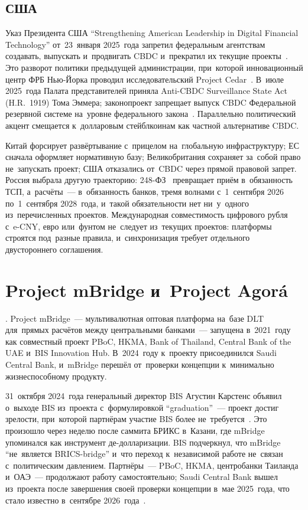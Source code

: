 \subsection*{США}

Указ Президента США \enquote{Strengthening American Leadership in Digital
Financial Technology} от~23~января 2025~года запретил федеральным агентствам
создавать, выпускать и~продвигать CBDC и~прекратил их текущие
проекты~\cite{trump-eo-digital-assets-2025}. Это разворот политики предыдущей
администрации, при~которой инновационный центр ФРБ Нью-Йорка проводил
исследовательский Project Cedar~\cite{nyfed-project-cedar}. В~июле 2025~года
Палата представителей приняла Anti-CBDC Surveillance State Act (H.R.~1919)
Тома Эммера; законопроект запрещает выпуск CBDC Федеральной резервной
системе на~уровне федерального закона~\cite{anti-cbdc-act-2025}. Параллельно политический акцент
смещается к~долларовым стейблкоинам как частной альтернативе CBDC.

Китай форсирует развёртывание с~прицелом на~глобальную инфраструктуру; ЕС
сначала оформляет нормативную базу; Великобритания сохраняет за~собой право
не~запускать проект; США отказались от~CBDC через прямой правовой запрет. Россия выбрала
другую траекторию: 248-ФЗ~\cite{fz-248} превращает приём в~обязанность
ТСП, а~расчёты~--- в~обязанность банков, тремя волнами с~1~сентября 2026
по~1~сентября 2028~года, и~такой обязательности нет ни~у~одного
из~перечисленных проектов. Международная совместимость цифрового рубля с~e-CNY,
евро или~фунтом не~следует из~текущих проектов: платформы строятся под~разные
правила, и~синхронизация требует отдельного двустороннего соглашения.

\section{{Project} {mBridge} и~Project {Agor{\'a}}}\label{sec:cbdc-mbridge-agora}

. Project mBridge~--- мультивалютная
оптовая платформа на~базе DLT для~прямых расчётов между центральными банками~---
запущена в~2021~году как совместный проект PBoC, HKMA, Bank of Thailand, Central
Bank of the UAE и~BIS Innovation Hub. В~2024~году к~проекту присоединился Saudi
Central Bank, и~mBridge перешёл от~проверки концепции к~минимально жизнеспособному
продукту.

31~октября 2024~года генеральный директор BIS Агустин Карстенс объявил о~выходе
BIS из~проекта с~формулировкой \enquote{graduation}~--- проект достиг зрелости,
при~которой партнёрам участие BIS более
не~требуется~\cite{bis-mbridge-graduation-2024}. Это произошло через неделю
после саммита БРИКС в~Казани, где mBridge упоминался как инструмент
де-долларизации. BIS подчеркнул, что mBridge \enquote{не~является BRICS-bridge}
и~что переход к~независимой работе не~связан с~политическим давлением.
Партнёры~--- PBoC, HKMA, центробанки Таиланда и~ОАЭ~--- продолжают работу
самостоятельно; Saudi Central Bank вышел из~проекта после завершения своей
проверки концепции в~мае 2025~года, что стало известно
в~сентябре 2026~года~\cite{sedaily-sama-mbridge-exit-2026}.

